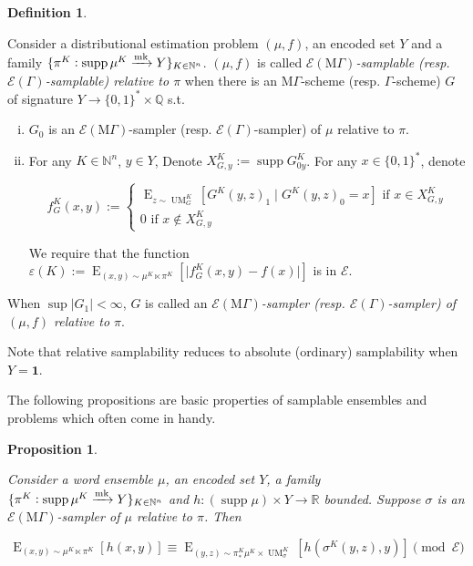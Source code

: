\documentclass{article}
\numberwithin{equation}{section}
\theoremstyle{definition}
\newtheorem{definition}{Definition}[section]
\theoremstyle{plain}
\newtheorem{proposition}{Proposition}[section]
\newcommand{\Bool}{\{0,1\}}
\newcommand{\Words}{{\Bool^*}}
\DeclareMathOperator{\Supp}{supp}
\DeclareMathOperator{\E}{E}
\DeclareMathOperator{\UM}{UM}
\newcommand{\Nats}{\mathbb{N}}
\newcommand{\Rats}{\mathbb{Q}}
\newcommand{\Reals}{\mathbb{R}}
\newcommand{\Abs}[1]{\lvert #1 \rvert}
\newcommand{\MGrow}{\mathrm{M}\Gamma}
\newcommand{\Fall}{\mathcal{E}}
\newcommand{\EG}{\Fall(\Gamma)}
\newcommand{\EMG}{\Fall(\MGrow)}
\newcommand{\Markov}{\xrightarrow{\textnormal{mk}}}
\begin{document}
\begin{samepage}
\begin{definition}
\label{def:gen_rel}

Consider a distributional estimation problem $(\mu,f)$, an encoded set $Y$ and a family $\{\pi^K: \Supp \mu^{K} \Markov Y\}_{K \in \Nats^n}$. $(\mu,f)$ is called \emph{$\EMG$-samplable (resp. $\EG$-samplable) relative to $\pi$} when there is an $\MGrow$-scheme (resp. $\Gamma$-scheme) $G$ of signature $Y \rightarrow \Words \times \Rats$ s.t.

\begin{enumerate}[(i)]

\item $G_0$ is an $\EMG$-sampler (resp. $\EG$-sampler) of $\mu$ relative to $\pi$.

\item For any $K \in \Nats^n$, $y \in Y$, Denote $X_{G,y}^K:=\Supp G_{0y}^K$. For any ${x \in \Words}$, denote 

$$f_G^K(x,y):=\begin{cases}\E_{z \sim\UM_G^K}[G^K(y,z)_1 \mid G^K(y,z)_0 = x] \text{ if } x \in X_{G,y}^K \\ 0 \text{ if } x \not\in X_{G,y}^K \end{cases}$$

We require that the function ${\varepsilon(K):=\E_{(x,y) \sim \mu^{K} \ltimes \pi^K}[\Abs{f_G^K(x,y)-f(x)}]}$ is in $\Fall$.

\end{enumerate}

When $\sup{\Abs{G_1}} < \infty$, $G$ is called an \emph{$\EMG$-sampler (resp. $\EG$-sampler) of $(\mu,f)$ relative to $\pi$}.

\end{definition}
\end{samepage}

Note that relative samplability reduces to absolute (ordinary) samplability when $Y=\bm{1}$.

The following propositions are basic properties of samplable ensembles and problems which often come in handy.

\begin{samepage}
\begin{proposition}
\label{prp:smp}

Consider a word ensemble $\mu$, an encoded set $Y$, a family ${\{\pi^K: \Supp \mu^{K} \Markov Y\}_{K \in \Nats^n}}$ and ${h: (\Supp \mu) \times Y \rightarrow \Reals}$ bounded. Suppose $\sigma$ is an $\EMG$-sampler of $\mu$ relative to $\pi$. Then

\begin{equation}
\label{eqn:prp__smp}
\E_{(x,y) \sim \mu^{K} \ltimes \pi^K}[h(x,y)] \equiv \E_{(y,z) \sim \pi_*^K\mu^{K} \times \UM_\sigma^K}[h(\sigma^K(y,z),y)] \pmod \Fall
\end{equation}

\end{proposition}
\end{samepage}
\end{document}
